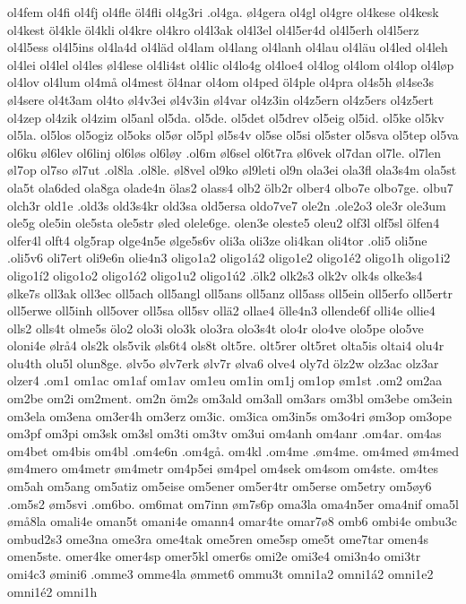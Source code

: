{{ol4fem
ol4fi
ol4fj
ol4fle
öl4fli
ol4g3ri
.ol4ga.
øl4gera
ol4gl
ol4gre
ol4kese
ol4kesk
ol4kest
öl4kle
öl4kli
ol4kre
ol4kro
ol4l3ak
ol4l3el
ol4l5er4d
ol4l5erh
ol4l5erz
ol4l5ess
ol4l5ins
ol4la4d
ol4läd
ol4lam
ol4lang
ol4lanh
ol4lau
ol4läu
ol4led
ol4leh
ol4lei
ol4lel
ol4les
øl4lese
ol4li4st
ol4lic
ol4lo4g
ol4loe4
ol4log
ol4lom
ol4lop
ol4løp
ol4lov
ol4lum
ol4må
ol4mest
öl4nar
ol4om
ol4ped
öl4ple
ol4pra
ol4s5h
øl4se3s
øl4sere
ol4t3am
ol4to
øl4v3ei
øl4v3in
øl4var
ol4z3in
ol4z5ern
ol4z5ers
ol4z5ert
ol4zep
ol4zik
ol4zim
ol5anl
ol5da.
ol5de.
ol5det
ol5drev
ol5eig
ol5id.
ol5ke
ol5kv
ol5la.
ol5los
ol5ogiz
ol5oks
ol5ør
ol5pl
øl5s4v
ol5se
ol5si
ol5ster
ol5sva
ol5tep
ol5va
ol6ku
øl6lev
ol6linj
ol6løs
ol6løy
.ol6m
øl6sel
ol6t7ra
øl6vek
ol7dan
ol7le.
ol7len
øl7op
ol7so
øl7ut
.ol8la
.ol8le.
øl8vel
ol9ko
øl9leti
ol9n
ola3ei
ola3fl
ola3s4m
ola5st
ola5t
ola6ded
ola8ga
olade4n
ölas2
olass4
olb2
ölb2r
olber4
olbo7e
olbo7ge.
olbu7
olch3r
old1e
.old3s
old3s4kr
old3sa
old5ersa
oldo7ve7
ole2n
.ole2o3
ole3r
ole3um
ole5g
ole5in
ole5sta
ole5str
øled
olele6ge.
olen3e
oleste5
oleu2
olf3l
olf5sl
ölfen4
olfer4l
olft4
olg5rap
olge4n5e
ølge5s6v
oli3a
oli3ze
oli4kan
oli4tor
.oli5
oli5ne
.oli5v6
oli7ert
oli9e6n
olie4n3
oligo1a2
oligo1á2
oligo1e2
oligo1é2
oligo1h
oligo1i2
oligo1í2
oligo1o2
oligo1ó2
oligo1u2
oligo1ú2
.ölk2
olk2s3
olk2v
olk4s
olke3s4
ølke7s
oll3ak
oll3ec
oll5ach
oll5angl
oll5ans
oll5anz
oll5ass
oll5ein
oll5erfo
oll5ertr
oll5erwe
oll5inh
oll5over
oll5sa
oll5sv
ollä2
ollae4
ölle4n3
ollende6f
olli4e
ollie4
olls2
olls4t
olme5s
ölo2
olo3i
olo3k
olo3ra
olo3s4t
olo4r
olo4ve
olo5pe
olo5ve
oloni4e
ølrå4
ols2k
ols5vik
øls6t4
ols8t
olt5re.
olt5rer
olt5ret
olta5is
oltai4
olu4r
olu4th
olu5l
olun8ge.
ølv5o
ølv7erk
ølv7r
ølva6
olve4
oly7d
ölz2w
olz3ac
olz3ar
olzer4
.om1
om1ac
om1af
om1av
om1eu
om1in
om1j
om1op
øm1st
.om2
om2aa
om2be
om2i
om2ment.
om2n
öm2s
om3ald
om3all
om3ars
om3bl
om3ebe
om3ein
om3ela
om3ena
om3er4h
om3erz
om3ic.
om3ica
om3in5s
om3o4ri
øm3op
om3ope
om3pf
om3pi
om3sk
om3sl
om3ti
om3tv
om3ui
om4anh
om4anr
.om4ar.
om4as
om4bet
om4bis
om4bl
.om4e6n
.om4gå.
om4kl
.om4me
.øm4me.
om4med
øm4med
øm4mero
om4metr
øm4metr
om4p5ei
øm4pel
om4sek
om4som
om4ste.
om4tes
om5ah
om5ang
om5atiz
om5eise
om5ener
om5er4tr
om5erse
om5etry
om5øy6
.om5s2
øm5svi
.om6bo.
om6mat
om7inn
øm7s6p
oma3la
oma4n5er
oma4nif
oma5l
ømå8la
omali4e
oman5t
omani4e
omann4
omar4te
omar7ø8
omb6
ombi4e
ombu3c
ombud2s3
ome3na
ome3ra
ome4tak
ome5ren
ome5sp
ome5t
ome7tar
omen4s
omen5ste.
omer4ke
omer4sp
omer5kl
omer6s
omi2e
omi3e4
omi3n4o
omi3tr
omi4c3
ømini6
.omme3
omme4la
ømmet6
ommu3t
omni1a2
omni1á2
omni1e2
omni1é2
omni1h
}}
